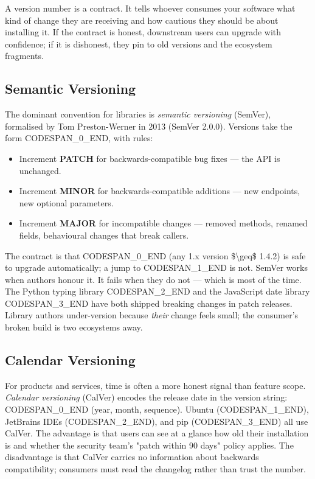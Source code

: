 \documentclass[11pt,a4paper]{book}
\begin{document}
A version number is a contract. It tells whoever consumes your software what kind of change they are receiving and how cautious they should be about installing it. If the contract is honest, downstream users can upgrade with confidence; if it is dishonest, they pin to old versions and the ecosystem fragments.

\subsection{Semantic Versioning}

The dominant convention for libraries is \textit{semantic versioning} (SemVer), formalised by Tom Preston-Werner in 2013 (SemVer 2.0.0). Versions take the form CODESPAN\_0\_END, with rules:

\begin{itemize}
  \item Increment \textbf{PATCH} for backwards-compatible bug fixes --- the API is unchanged.
  \item Increment \textbf{MINOR} for backwards-compatible additions --- new endpoints, new optional parameters.
  \item Increment \textbf{MAJOR} for incompatible changes --- removed methods, renamed fields, behavioural changes that break callers.
\end{itemize}

The contract is that CODESPAN\_0\_END (any 1.x version \$\textbackslash{}geq\$ 1.4.2) is safe to upgrade automatically; a jump to CODESPAN\_1\_END is not. SemVer works when authors honour it. It fails when they do not --- which is most of the time. The Python typing library CODESPAN\_2\_END and the JavaScript date library CODESPAN\_3\_END have both shipped breaking changes in patch releases. Library authors under-version because \textit{their} change feels small; the consumer's broken build is two ecosystems away.

\subsection{Calendar Versioning}

For products and services, time is often a more honest signal than feature scope. \textit{Calendar versioning} (CalVer) encodes the release date in the version string: CODESPAN\_0\_END (year, month, sequence). Ubuntu (CODESPAN\_1\_END), JetBrains IDEs (CODESPAN\_2\_END), and pip (CODESPAN\_3\_END) all use CalVer. The advantage is that users can see at a glance how old their installation is and whether the security team's "patch within 90 days" policy applies. The disadvantage is that CalVer carries no information about backwards compatibility; consumers must read the changelog rather than trust the number.
\end{document}

